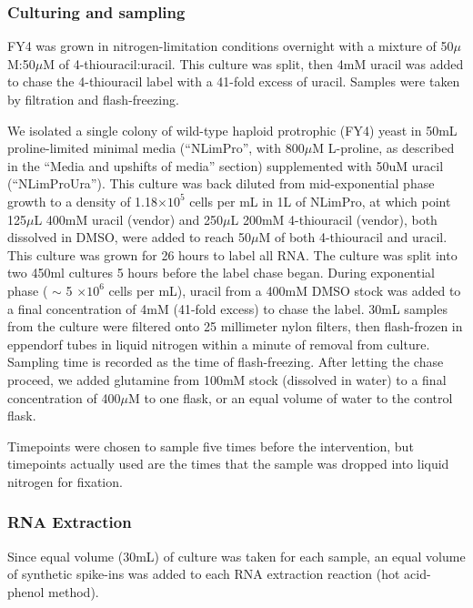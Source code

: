{\subsubsection{Culturing and sampling}\label{culturing-and-sampling}

FY4 was grown in nitrogen-limitation conditions overnight with a mixture
of 50\(\mu\)M:50\(\mu\)M of 4-thiouracil:uracil. This culture was split,
then 4mM uracil was added to chase the 4-thiouracil label with a 41-fold
excess of uracil. Samples were taken by filtration and flash-freezing.

We isolated a single colony of wild-type haploid protrophic (FY4) yeast
in 50mL proline-limited minimal media (``NLimPro'', with 800\(\mu\)M
L-proline, as described in the ``Media and upshifts of media'' section)
supplemented with 50uM uracil (``NLimProUra''). This culture was back
diluted from mid-exponential phase growth to a density of
1.18\(\times 10^5\) cells per mL in 1L of NLimPro, at which point
125\(\mu\)L 400mM uracil (vendor) and 250\(\mu\)L 200mM 4-thiouracil
(vendor), both dissolved in DMSO, were added to reach 50\(\mu\)M of both
4-thiouracil and uracil. This culture was grown for 26 hours to label
all RNA. The culture was split into two 450ml cultures 5 hours before
the label chase began. During exponential phase ( \(\sim\) 5
\(\times 10^6\) cells per mL), uracil from a 400mM DMSO stock was added
to a final concentration of 4mM (41-fold excess) to chase the label.
30mL samples from the culture were filtered onto 25 millimeter nylon
filters, then flash-frozen in eppendorf tubes in liquid nitrogen within
a minute of removal from culture. Sampling time is recorded as the time
of flash-freezing. After letting the chase proceed, we added glutamine
from 100mM stock (dissolved in water) to a final concentration of
400\(\mu\)M to one flask, or an equal volume of water to the control
flask.

Timepoints were chosen to sample five times before the intervention,
but timepoints actually used are the times that the sample was dropped
into liquid nitrogen for fixation.

\subsubsection{RNA Extraction}

Since equal volume (30mL) of culture was taken for each sample, an equal
volume of synthetic spike-ins was added to each RNA extraction reaction
(hot acid-phenol method).

}

